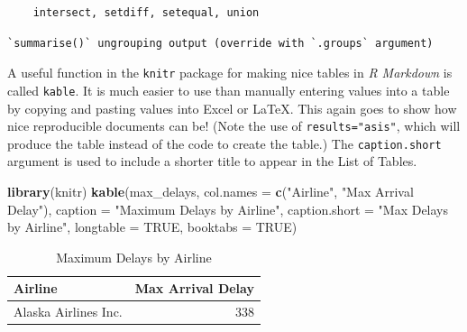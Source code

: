 \documentclass[twoside,12pt,final]{ucthesis-CA2012}
\newenvironment{Shaded}{}{}
\newcommand{\KeywordTok}[1]{\textcolor[rgb]{0.00,0.44,0.13}{\textbf{{#1}}}}
\newcommand{\DataTypeTok}[1]{\textcolor[rgb]{0.56,0.13,0.00}{{#1}}}
\newcommand{\StringTok}[1]{\textcolor[rgb]{0.25,0.44,0.63}{{#1}}}
\newcommand{\OtherTok}[1]{\textcolor[rgb]{0.00,0.44,0.13}{{#1}}}
\newcommand{\NormalTok}[1]{{#1}}
\newcommand{\OperatorTok}[1]{\textcolor[rgb]{0.00,0.44,0.13}{\textbf{{#1}}}}
\begin{document}
\begin{ucmainmatter}
\begin{verbatim}
    intersect, setdiff, setequal, union
\end{verbatim}
\begin{Shaded}
\end{Shaded}
\begin{verbatim}
`summarise()` ungrouping output (override with `.groups` argument)
\end{verbatim}
A useful function in the \texttt{knitr} package for making nice tables in \emph{R Markdown} is called \texttt{kable}. It is much easier to use than manually entering values into a table by copying and pasting values into Excel or LaTeX. This again goes to show how nice reproducible documents can be! (Note the use of \texttt{results="asis"}, which will produce the table instead of the code to create the table.) The \texttt{caption.short} argument is used to include a shorter title to appear in the List of Tables.
\begin{Shaded}
\begin{Highlighting}[]
\KeywordTok{library}\NormalTok{(knitr)}
\KeywordTok{kable}\NormalTok{(max_delays, }
      \DataTypeTok{col.names =} \KeywordTok{c}\NormalTok{(}\StringTok{"Airline"}\NormalTok{, }\StringTok{"Max Arrival Delay"}\NormalTok{),}
      \DataTypeTok{caption =} \StringTok{"Maximum Delays by Airline"}\NormalTok{,}
      \DataTypeTok{caption.short =} \StringTok{"Max Delays by Airline"}\NormalTok{,}
      \DataTypeTok{longtable =} \OtherTok{TRUE}\NormalTok{,}
      \DataTypeTok{booktabs =} \OtherTok{TRUE}\NormalTok{)}
\end{Highlighting}
\end{Shaded}
\begin{longtable}[t]{lr}
\caption[Max Delays by Airline]{\label{tab:maxdelays}Maximum Delays by Airline}\\
\toprule
Airline & Max Arrival Delay\\
\midrule
Alaska Airlines Inc. & 338\\

\end{longtable}
\end{ucmainmatter}
\end{document}
